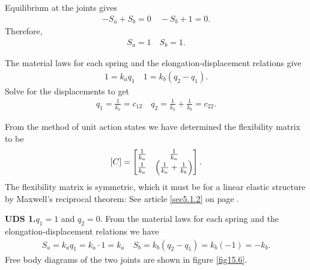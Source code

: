 \documentclass{AeroStructure-ERJohnson}
\begin{document}
\begin{example}
{\def\thefigure{15.6}
}

\vspace*{-7pt}

\noindent Equilibrium at the joints gives
\begin{align}\label{ex15.1g}
-S_{a}+S_{b}=0 \quad-S_{b}+1=0.
\end{align}
Therefore,
\begin{align}\label{ex15.1h}
S_{a}=1 \quad S_{b}=1.
\end{align}

The material laws for each spring and the elongation-displacement relations give
\begin{align}\label{ex15.1i}
1=k_{a} q_{1} \quad 1=k_{b}\left(q_{2}-q_{1}\right).
\end{align}
Solve for the displacements to get
\begin{align}\label{ex15.1j}
q_{1}=\frac{1}{k_{a}}=c_{12} \quad q_{2}=\frac{1}{k_{a}}+\frac{1}{k_{b}}=c_{22}.
\end{align}

From the method of unit action states we have determined the flexibility matrix to be
\begin{align}\label{ex15.1k}
[C]=\left[\begin{array}{@{}cc@{}}\frac{1}{k_{a}} & \frac{1}{k_{a}} \\\frac{1}{k_{a}} & \left(\frac{1}{k_{a}}+\frac{1}{k_{b}}\right)\end{array}\right].
\end{align}
The flexibility matrix is symmetric, which it must be for a linear elastic structure by Maxwell's reciprocal theorem: See article \ref{sec5.1.2} on page \pageref{sec5.1.2}.

\noindent\textbf{UDS 1.}\enskip $q_{1}=1$ and $q_{2}=0$. From the material laws for each spring and the elongation-displacement relations we have
\begin{align}\label{ex15.1l}
S_{a}=k_{a} q_{1}=k_{a} \cdot 1=k_{a} \quad S_{b}=k_{b}\left(q_{2}-q_{1}\right)=k_{b}(-1)=-k_{b}.
\end{align}
Free body diagrams of the two joints are shown in figure \ref{fig15.6}.


\end{example}
\end{document}
